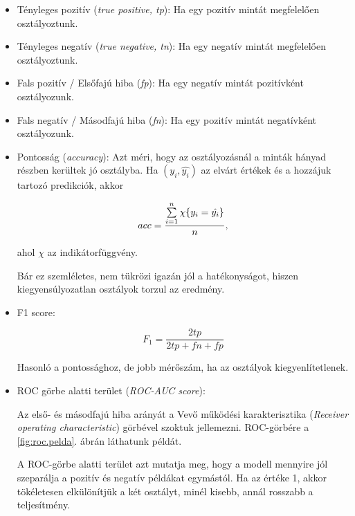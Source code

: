 \begin{itemize}
	\item 
	Tényleges pozitív (\textit{true positive, tp}): Ha egy pozitív mintát megfelelően osztályoztunk.
	
	\item 
	Tényleges negatív (\textit{true negative, tn}): Ha egy negatív mintát megfelelően osztályoztunk.

	\item 
	Fals pozitív / Elsőfajú hiba (\textit{fp}): Ha egy negatív mintát pozitívként osztályozunk.
	
	\item 
	Fals negatív / Másodfajú hiba (\textit{fn}): Ha egy pozitív mintát negatívként osztályozunk.
	
	\item 
	Pontosság (\textit{accuracy}):
	Azt méri, hogy az osztályozásnál a minták hányad részben
	kerültek jó osztályba.
	Ha $ (y_i, \hat{y_i}) $ az elvárt értékek és a hozzájuk tartozó 
	predikciók, akkor
	
	\[  acc = \dfrac{\sum\limits_{{i}=1}^{n} \chi\{y_i = \hat{y_i}\}}{n} , \]
	
	ahol $ \chi $ az indikátorfüggvény.
	
	Bár ez szemléletes, nem tükrözi igazán jól a hatékonyságot, hiszen kiegyensúlyozatlan osztályok torzul az eredmény.
	
	\item 
	F1 score:
	
	\[  F_1 = \dfrac{2tp}{2tp + fn + fp}  \]
	
	\noindent
	Hasonló a pontossághoz, de jobb mérőszám, ha az osztályok kiegyenlítetlenek.
	
	
	\item 
	ROC görbe alatti terület (\textit{ROC-AUC score}):
	
	
	Az első- és másodfajú hiba arányát a Vevő működési karakterisztika \cite{rocanalysis} (\textit{Receiver operating characteristic}) görbével szoktuk jellemezni. ROC-görbére a \ref{fig:roc.pelda}. ábrán láthatunk példát.
	
	A ROC-görbe alatti terület azt mutatja meg, hogy a modell mennyire jól szeparálja a pozitív és negatív példákat egymástól. 
	Ha az értéke 1, akkor tökéletesen elkülönítjük a két osztályt, 
	minél kisebb, annál rosszabb a teljesítmény.
	
\end{itemize}


